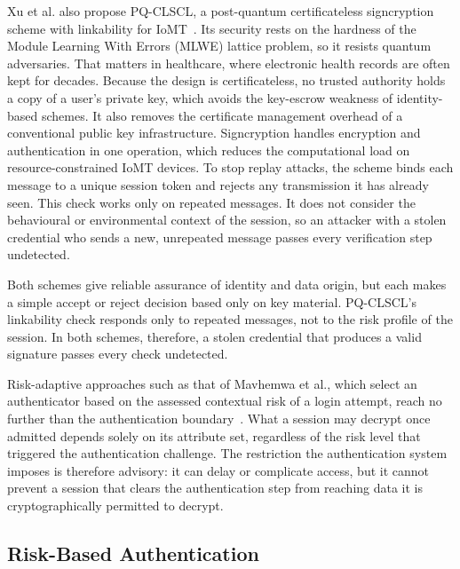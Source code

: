 Xu et al. also propose PQ-CLSCL, a post-quantum certificateless signcryption scheme with linkability for IoMT~\cite{xu2025pqclscl}. Its security rests on the hardness of the Module Learning With Errors (MLWE) lattice problem, so it resists quantum adversaries. That matters in healthcare, where electronic health records are often kept for decades. Because the design is certificateless, no trusted authority holds a copy of a user's private key, which avoids the key-escrow weakness of identity-based schemes. It also removes the certificate management overhead of a conventional public key infrastructure. Signcryption handles encryption and authentication in one operation, which reduces the computational load on resource-constrained IoMT devices. To stop replay attacks, the scheme binds each message to a unique session token and rejects any transmission it has already seen. This check works only on repeated messages. It does not consider the behavioural or environmental context of the session, so an attacker with a stolen credential who sends a new, unrepeated message passes every verification step undetected.

Both schemes give reliable assurance of identity and data origin, but each makes a simple accept or reject decision based only on key material. PQ-CLSCL's linkability check responds only to repeated messages, not to the risk profile of the session. In both schemes, therefore, a stolen credential that produces a valid signature passes every check undetected.

Risk-adaptive approaches such as that of Mavhemwa et al., which select an authenticator based on the assessed contextual risk of a login attempt, reach no further than the authentication boundary~\cite{mavhemwa2025naivebayes}. What a session may decrypt once admitted depends solely on its attribute set, regardless of the risk level that triggered the authentication challenge. The restriction the authentication system imposes is therefore advisory: it can delay or complicate access, but it cannot prevent a session that clears the authentication step from reaching data it is cryptographically permitted to decrypt.

\subsection{Risk-Based Authentication}
\label{sec:subsection_213rba}

